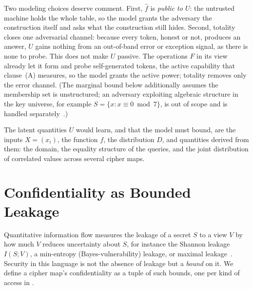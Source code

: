 \documentclass[11pt]{article}
\newcommand{\fhat}{\hat{f}}
\theoremstyle{definition}
\theoremstyle{plain}
\theoremstyle{remark}
\begin{document}
Two modeling choices deserve comment. First, $\fhat$ is \emph{public to $U$}: the
untrusted machine holds the whole table, so the model grants the adversary the
construction itself and asks what the construction still hides. Second, totality
closes one adversarial channel: because every token, honest or not, produces an
answer, $U$ gains nothing from an out-of-band error or exception signal, as there
is none to probe. This does not make $U$ passive. The operations $F$ in its view
already let it form and probe self-generated tokens, the active capability that
clause~(A) measures, so the model grants the active power; totality removes only
the error channel. (The marginal bound below additionally assumes the membership
set is unstructured; an adversary exploiting algebraic structure in the key
universe, for example $S = \{x : x \equiv 0 \bmod 7\}$, is out of scope and is
handled separately~\cite{towell2026maxconf}.)

The latent quantities $U$ would learn, and that the model must bound, are the
inputs $X = (x_i)$, the function $f$, the distribution $D$, and quantities
derived from them: the domain, the equality structure of the queries, and the
joint distribution of correlated values across several cipher maps.

\section{Confidentiality as Bounded Leakage}
\label{sec:definition}

Quantitative information flow measures the leakage of a secret $S$ to a view
$V$ by how much $V$ reduces uncertainty about $S$, for instance the Shannon
leakage $I(S; V)$, a min-entropy (Bayes-vulnerability) leakage, or maximal
leakage~\cite{issa2020maximal}. Security in
this language is not the absence of leakage but a \emph{bound} on it. We define
a cipher map's confidentiality as a tuple of such bounds, one per kind of
access in .
\end{document}
